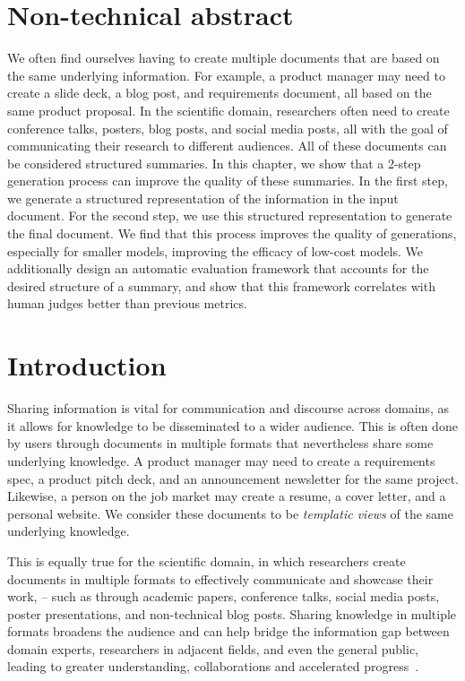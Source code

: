 \section*{Non-technical abstract}
We often find ourselves having to create multiple documents that are based on the same underlying information. For example, a product manager may need to create a slide deck, a blog post, and requirements document, all based on the same product proposal. In the scientific domain, researchers often need to create conference talks, posters, blog posts, and social media posts, all with the goal of communicating their research to different audiences. All of these documents can be considered structured summaries. In this chapter, we show that a 2-step generation process can improve the quality of these summaries. In the first step, we generate a structured representation of the information in the input document. For the second step, we use this structured representation to generate the final document. We find that this process improves the quality of generations, especially for smaller models, improving the efficacy of low-cost models. We additionally design an automatic evaluation framework that accounts for the desired structure of a summary, and show that this framework correlates with human judges better than previous metrics.


\section{Introduction}
Sharing information is vital for communication and discourse across domains, as it allows for knowledge to be disseminated to a wider audience. This is often done by users through documents in multiple formats that nevertheless share some underlying knowledge. A product manager may need to create a requirements spec, a product pitch deck, and an announcement newsletter for the same project. Likewise, a person on the job market may create a resume, a cover letter, and a personal website. We consider these documents to be \textit{templatic views} of the same underlying knowledge.

This is equally true for the scientific domain, in which researchers create documents in multiple formats to effectively communicate and showcase their work, -- such as through academic papers, conference talks, social media posts, poster presentations, and non-technical blog posts. Sharing knowledge in multiple formats broadens the audience and can help bridge the information gap between domain experts, researchers in adjacent fields, and even the general public, leading to greater understanding, collaborations and accelerated progress~\cite{Bornmann2014GrowthRO}.


